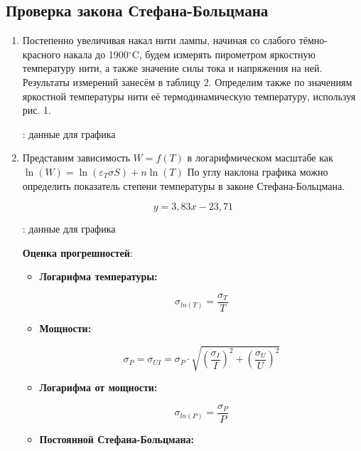 \documentclass[15pt,a5paper,reqno]{article}
\begin{document}
\subsection{Проверка закона Стефана-Больцмана}
\begin{enumerate}

\item Постепенно увеличивая накал нити лампы, начиная со слабого тёмно-красного накала до 1900$^{\circ}$C, будем измерять пирометром яркостную температуру нити, а также значение силы тока и напряжения на ней. Результаты измерений занесём в таблицу 2. Определим также по значениям яркостной температуры нити её термодинамическую температуру, используя рис. 1.
    
\begin{table}[h!]
        \centering
        
        \caption{: данные для графика}
    \label{tb_2}
\end{table}

\item Представим зависимость $W=f(T)$ в логарифмическом масштабе как $\ln(W) = \ln(\varepsilon_T \sigma S) + n \ln(T)$ По углу наклона графика можно определить показатель степени температуры в законе Стефана-Больцмана. 

\[ y = 3,83x - 23,71 \] 

\begin{table}[h!]
    \centering
    
    \caption{: данные для графика}
\label{tb_3}
\end{table}

\textbf{Оценка прогрешностей}:

\begin{itemize}
    \item \textbf{Логарифма температуры:}
      
    \[  \sigma_{ln(T)} = \frac{\sigma_T}{T} \]

    \item \textbf{Мощности:}
    
    \[ \sigma_{P} = \sigma_{UI} = \sigma_P \cdot \sqrt{\left( \frac{\sigma_I}{I} \right)^{2}  +  \left( \frac{\sigma_U}{U} \right)^{2}} \]
    
    \item \textbf{Логарифма от мощности:}
    
    \[ \sigma_{ln(P)} = \frac{\sigma_P}{P}\]

    \item \textbf{Постоянной Стефана-Больцмана:}
    

\end{itemize}
\end{enumerate}
\end{document}
